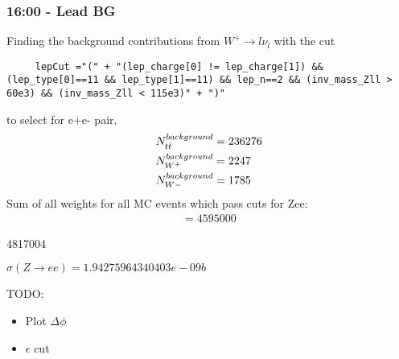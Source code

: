 \subsubsection*{16:00 - Lead BG}
Finding the background contributions from $W^+ \rightarrow l\nu_l $ with the cut
\begin{lstlisting}
     lepCut ="(" + "(lep_charge[0] != lep_charge[1]) && (lep_type[0]==11 && lep_type[1]==11) && lep_n==2 && (inv_mass_Zll > 60e3) && (inv_mass_Zll < 115e3)" + ")"
\end{lstlisting}
to select for e+e- pair.
\begin{align}
    N^{background}_{t\Bar{t}} &= 236276
    \\
    N^{background}_{W^+} &= 2247
    \\
    N^{background}_{W-} &= 1785
\end{align}
Sum of all weights for all MC events which pass cuts for Zee:
\begin{align*}
    = 4595000
\end{align*}

4817004

$\sigma(Z \rightarrow ee) = 1.94275964340403e-09 b$


TODO:
\begin{itemize}
    \item Plot $ \Delta \phi$
    \item $\epsilon$ cut
\end{itemize}



